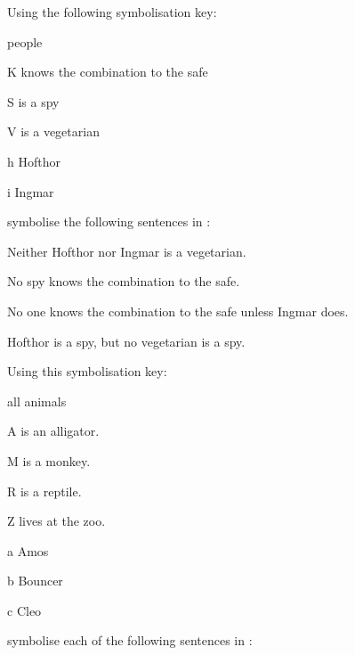 \problempart
\label{pr.FOLvegetarians}
Using the following symbolisation key:
\begin{ekey}
\item[\text{domain}] people
\item[K]  knows the combination to the safe
\item[S]  is a spy
\item[V]  is a vegetarian
\item[h] Hofthor
\item[i] Ingmar
\end{ekey}
symbolise the following sentences in \FOL:
\begin{earg}
\item Neither Hofthor nor Ingmar is a vegetarian.
\item No spy knows the combination to the safe.
\item No one knows the combination to the safe unless Ingmar does.
\item Hofthor is a spy, but no vegetarian is a spy.
\end{earg}
\solutions
\problempart\label{pr.FOLalligators}
Using this symbolisation key:
\begin{ekey}
\item[\text{domain}] all animals
\item[A]  is an alligator.
\item[M]  is a monkey.
\item[R]  is a reptile.
\item[Z]  lives at the zoo.
\item[a] Amos
\item[b] Bouncer
\item[c] Cleo
\end{ekey}
symbolise each of the following sentences in \FOL:
